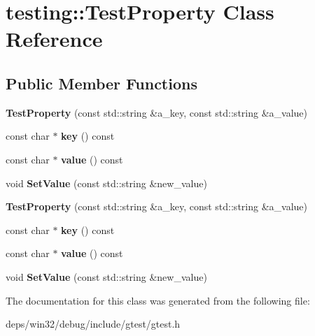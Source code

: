 \hypertarget{classtesting_1_1_test_property}{}\section{testing\+:\+:Test\+Property Class Reference}
\label{classtesting_1_1_test_property}
\subsection*{Public Member Functions}
\begin{DoxyCompactItemize}
\item 
\hypertarget{classtesting_1_1_test_property_a25a0ccf1c75a92af46a48d3c2a873e6d}{}{\bfseries Test\+Property} (const std\+::string \&a\+\_\+key, const std\+::string \&a\+\_\+value)\label{classtesting_1_1_test_property_a25a0ccf1c75a92af46a48d3c2a873e6d}

\item 
\hypertarget{classtesting_1_1_test_property_a2c569d47685b89aa64e737fb11df3aba}{}const char $\ast$ {\bfseries key} () const \label{classtesting_1_1_test_property_a2c569d47685b89aa64e737fb11df3aba}

\item 
\hypertarget{classtesting_1_1_test_property_ad46323c18491f365d72d8a4288f54bd6}{}const char $\ast$ {\bfseries value} () const \label{classtesting_1_1_test_property_ad46323c18491f365d72d8a4288f54bd6}

\item 
\hypertarget{classtesting_1_1_test_property_a377245335d9f614cd06d1650e3358e1d}{}void {\bfseries Set\+Value} (const std\+::string \&new\+\_\+value)\label{classtesting_1_1_test_property_a377245335d9f614cd06d1650e3358e1d}

\item 
\hypertarget{classtesting_1_1_test_property_a25a0ccf1c75a92af46a48d3c2a873e6d}{}{\bfseries Test\+Property} (const std\+::string \&a\+\_\+key, const std\+::string \&a\+\_\+value)\label{classtesting_1_1_test_property_a25a0ccf1c75a92af46a48d3c2a873e6d}

\item 
\hypertarget{classtesting_1_1_test_property_a2c569d47685b89aa64e737fb11df3aba}{}const char $\ast$ {\bfseries key} () const \label{classtesting_1_1_test_property_a2c569d47685b89aa64e737fb11df3aba}

\item 
\hypertarget{classtesting_1_1_test_property_ad46323c18491f365d72d8a4288f54bd6}{}const char $\ast$ {\bfseries value} () const \label{classtesting_1_1_test_property_ad46323c18491f365d72d8a4288f54bd6}

\item 
\hypertarget{classtesting_1_1_test_property_a377245335d9f614cd06d1650e3358e1d}{}void {\bfseries Set\+Value} (const std\+::string \&new\+\_\+value)\label{classtesting_1_1_test_property_a377245335d9f614cd06d1650e3358e1d}

\end{DoxyCompactItemize}


The documentation for this class was generated from the following file\+:\begin{DoxyCompactItemize}
\item 
deps/win32/debug/include/gtest/gtest.\+h\end{DoxyCompactItemize}
